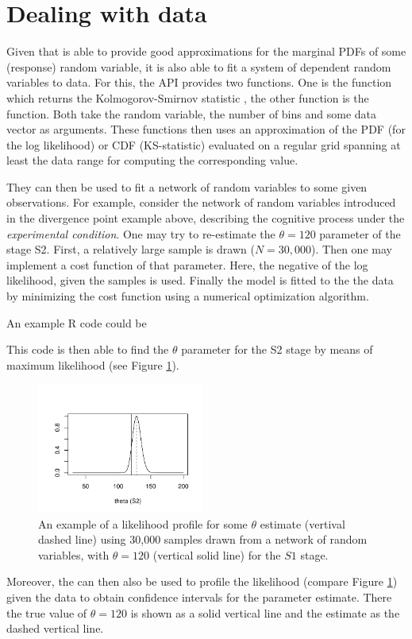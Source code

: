 \section{Dealing with data} \label{sec:data}
Given that  is able to provide good approximations for the marginal PDFs of some
(response) random variable, it is also able to fit a system of dependent random variables to data.
For this, the  API provides two functions. One is the  function
which returns the Kolmogorov-Smirnov statistic \cite[KS-statistic, e.g.,][]{Kolmogorov1933,
Smirnov1948, Marsaglia2003}, the other function is the  function. Both take
the random variable, the number of bins and some data vector as arguments. These functions then
uses an approximation of the PDF (for the log likelihood) or CDF (KS-statistic) evaluated on a
regular grid spanning at least the data range for computing the corresponding value.

They can then be used to fit a network of random variables to some given observations. For
example, consider the network of random variables introduced in the divergence point example 
above, describing the cognitive
process under the \emph{experimental condition}. One may try to re-estimate the $\theta=120$
parameter of the stage S2. First, a relatively large sample is drawn ($N=30,000$). Then one may
implement a cost function of that parameter. Here, the negative of the log likelihood, given the
samples is used. Finally the model is fitted to the the data by minimizing the cost function using
a numerical optimization algorithm.

An example R code could be


This code is then able to find the $\theta$ parameter for the S2 stage by means of maximum likelihood (see Figure
\ref{fig:llprof}). 

\begin{figure}[!ht]
 \centering
 \includegraphics[width=0.49\textwidth]{fig/pod_likelihoodProf.pdf}
 \caption{An example of a likelihood profile for some $\theta$ estimate (vertival dashed line)
 using 30,000 samples drawn from a network of random variables, with $\theta=120$ (vertical
 solid line) for the $S1$ stage.} \label{fig:llprof}
\end{figure}

Moreover, the  can then also be used to profile the likelihood (compare Figure
\ref{fig:llprof}) given the data to obtain confidence intervals for the parameter estimate. There
the true value of $\theta=120$ is shown as a solid vertical line and the estimate as the dashed
vertical line. 